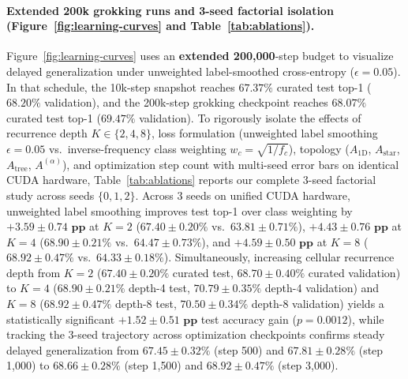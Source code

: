 \documentclass[10pt,twocolumn,letterpaper]{article}
\begin{document}
\paragraph{Extended 200k grokking runs and 3-seed factorial isolation (Figure~\ref{fig:learning-curves} and Table~\ref{tab:ablations}).}
Figure~\ref{fig:learning-curves} uses an \textbf{extended 200{,}000}-step budget to visualize delayed generalization under unweighted label-smoothed cross-entropy ($\epsilon=0.05$). In that schedule, the 10k-step snapshot reaches $67.37\%$ curated test top-1 ($68.20\%$ validation), and the 200k-step grokking checkpoint reaches $68.07\%$ curated test top-1 ($69.47\%$ validation). To rigorously isolate the effects of recurrence depth $K \in \{2, 4, 8\}$, loss formulation (unweighted label smoothing $\epsilon=0.05$ vs.\ inverse-frequency class weighting $w_c = \sqrt{1/f_c}$), topology ($A_{\text{1D}}$, $A_{\text{star}}$, $A_{\text{tree}}$, $A^{(\alpha)}$), and optimization step count with multi-seed error bars on identical CUDA hardware, Table~\ref{tab:ablations} reports our complete 3-seed factorial study across seeds $\{0,1,2\}$. Across 3 seeds on unified CUDA hardware, unweighted label smoothing improves test top-1 over class weighting by $\mathbf{+3.59 \pm 0.74\text{ pp}}$ at $K=2$ ($67.40 \pm 0.20\%$ vs.\ $63.81 \pm 0.71\%$), $\mathbf{+4.43 \pm 0.76\text{ pp}}$ at $K=4$ ($68.90 \pm 0.21\%$ vs.\ $64.47 \pm 0.73\%$), and $\mathbf{+4.59 \pm 0.50\text{ pp}}$ at $K=8$ ($68.92 \pm 0.47\%$ vs.\ $64.33 \pm 0.18\%$). Simultaneously, increasing cellular recurrence depth from $K=2$ ($67.40 \pm 0.20\%$ curated test, $68.70 \pm 0.40\%$ curated validation) to $K=4$ ($68.90 \pm 0.21\%$ depth-4 test, $70.79 \pm 0.35\%$ depth-4 validation) and $K=8$ ($68.92 \pm 0.47\%$ depth-8 test, $70.50 \pm 0.34\%$ depth-8 validation) yields a statistically significant $\mathbf{+1.52 \pm 0.51\text{ pp}}$ test accuracy gain ($p = 0.0012$), while tracking the 3-seed trajectory across optimization checkpoints confirms steady delayed generalization from $67.45 \pm 0.32\%$ (step 500) and $67.81 \pm 0.28\%$ (step 1{,}000) to $68.66 \pm 0.28\%$ (step 1{,}500) and $\mathbf{68.92 \pm 0.47\%}$ (step 3{,}000).
\end{document}
